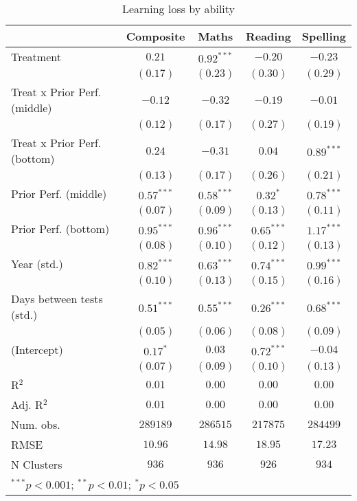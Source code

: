 
\begin{table}
\begin{center}
\begin{tabular}{l c c c c}
\hline
 & Composite & Maths & Reading & Spelling \\
\hline
Treatment                    & $0.21$       & $0.92^{***}$ & $-0.20$      & $-0.23$      \\
                             & $(0.17)$     & $(0.23)$     & $(0.30)$     & $(0.29)$     \\
Treat x Prior Perf. (middle) & $-0.12$      & $-0.32$      & $-0.19$      & $-0.01$      \\
                             & $(0.12)$     & $(0.17)$     & $(0.27)$     & $(0.19)$     \\
Treat x Prior Perf. (bottom) & $0.24$       & $-0.31$      & $0.04$       & $0.89^{***}$ \\
                             & $(0.13)$     & $(0.17)$     & $(0.26)$     & $(0.21)$     \\
Prior Perf. (middle)         & $0.57^{***}$ & $0.58^{***}$ & $0.32^{*}$   & $0.78^{***}$ \\
                             & $(0.07)$     & $(0.09)$     & $(0.13)$     & $(0.11)$     \\
Prior Perf. (bottom)         & $0.95^{***}$ & $0.96^{***}$ & $0.65^{***}$ & $1.17^{***}$ \\
                             & $(0.08)$     & $(0.10)$     & $(0.12)$     & $(0.13)$     \\
Year (std.)                  & $0.82^{***}$ & $0.63^{***}$ & $0.74^{***}$ & $0.99^{***}$ \\
                             & $(0.10)$     & $(0.13)$     & $(0.15)$     & $(0.16)$     \\
Days between tests (std.)    & $0.51^{***}$ & $0.55^{***}$ & $0.26^{***}$ & $0.68^{***}$ \\
                             & $(0.05)$     & $(0.06)$     & $(0.08)$     & $(0.09)$     \\
(Intercept)                  & $0.17^{*}$   & $0.03$       & $0.72^{***}$ & $-0.04$      \\
                             & $(0.07)$     & $(0.09)$     & $(0.10)$     & $(0.13)$     \\
\hline
R$^2$                        & $0.01$       & $0.00$       & $0.00$       & $0.00$       \\
Adj. R$^2$                   & $0.01$       & $0.00$       & $0.00$       & $0.00$       \\
Num. obs.                    & $289189$     & $286515$     & $217875$     & $284499$     \\
RMSE                         & $10.96$      & $14.98$      & $18.95$      & $17.23$      \\
N Clusters                   & $936$        & $936$        & $926$        & $934$        \\
\hline
\multicolumn{5}{l}{\scriptsize{$^{***}p<0.001$; $^{**}p<0.01$; $^{*}p<0.05$}}
\end{tabular}
\caption{Learning loss by ability}
\label{tableability}
\end{center}
\end{table}
